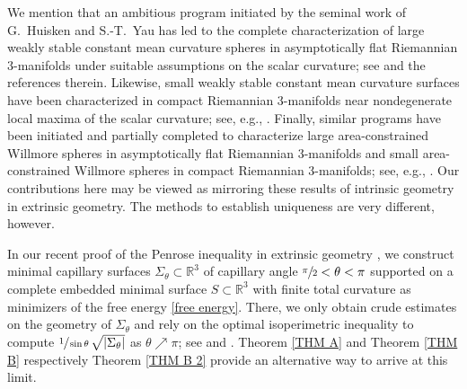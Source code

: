 \documentclass[11pt]{amsart}
\begin{document}
We mention that an ambitious program initiated by the seminal work of G.~Huisken and S.-T.~Yau \cite{HuiskenYau} has led to the complete characterization of large weakly stable constant mean curvature spheres in asymptotically flat Riemannian 3-manifolds under suitable assumptions on the scalar curvature; see \cite{Brendle,EichmairBrendle,EichmairChodosh,cmc} and the references therein. Likewise, small weakly stable constant mean curvature surfaces have been characterized in compact Riemannian 3-manifolds near nondegenerate local maxima of the scalar curvature; see, e.g., \cite{Ye,Pacard}. Finally, similar programs have been initiated and partially completed to characterize  large area-constrained Willmore spheres in asymptotically flat Riemannian 3-manifolds and small area-constrained Willmore spheres in compact Riemannian 3-manifolds; see, e.g., \cite{LMS1,LMS2,largearea,HuiskenYauUniqueness}. Our contributions here may be viewed as mirroring these results of intrinsic geometry in extrinsic geometry. The methods to establish uniqueness are very different, however.

In our recent proof of the Penrose inequality in extrinsic geometry \cite{eichmair2024penrose}, we construct minimal capillary surfaces $\Sigma_\theta \subset \mathbb{R}^3$ of capillary angle $\sfrac{\pi}2<\theta<\pi$ supported on a complete embedded minimal surface $S\subset \mathbb{R}^3$ with finite total curvature as minimizers of the free energy \eqref{free energy}. There, we only obtain crude estimates on the geometry of $\Sigma_\theta$ and rely on the optimal isoperimetric inequality to compute $\sfrac{1}{\sin \theta}\,\sqrt{|\Sigma_\theta|}$ as $\theta \nearrow \pi$; see \cite[Lemma 26 and Proposition 37]{eichmair2024penrose} and \cite{Carleman,Brendleiso,EichmairBrendleIso}. Theorem \ref{THM A} and Theorem \ref{THM B} respectively Theorem \ref{THM B 2} provide an alternative  way to arrive at this limit.
\end{document}
